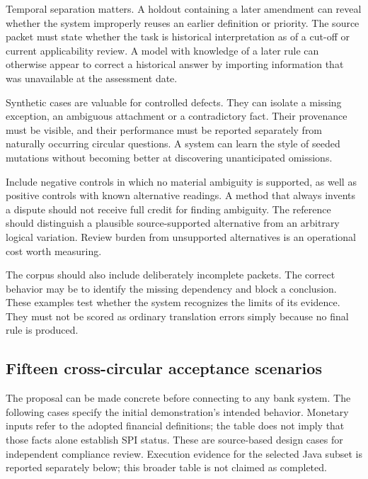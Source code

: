 Temporal separation matters. A holdout containing a later amendment can reveal
whether the system improperly reuses an earlier definition or priority. The
source packet must state whether the task is historical interpretation as of a
cut-off or current applicability review. A model with knowledge of a later rule
can otherwise appear to correct a historical answer by importing information
that was unavailable at the assessment date.

Synthetic cases are valuable for controlled defects. They can isolate a missing
exception, an ambiguous attachment or a contradictory fact. Their provenance must
be visible, and their performance must be reported separately from naturally
occurring circular questions. A system can learn the style of seeded mutations
without becoming better at discovering unanticipated omissions.

Include negative controls in which no material ambiguity is supported, as well
as positive controls with known alternative readings. A method that always
invents a dispute should not receive full credit for finding ambiguity. The
reference should distinguish a plausible source-supported alternative from an
arbitrary logical variation. Review burden from unsupported alternatives is an
operational cost worth measuring.

The corpus should also include deliberately incomplete packets. The correct
behavior may be to identify the missing dependency and block a conclusion. These
examples test whether the system recognizes the limits of its evidence. They
must not be scored as ordinary translation errors simply because no final rule
is produced.

\subsection{Fifteen cross-circular acceptance scenarios}
\label{merge:P-05-evidence:00}

\label{sec:evidence}

The proposal can be made concrete before connecting to any bank system. The
following cases specify the initial demonstration's intended behavior. Monetary
inputs refer to the adopted financial definitions; the table does not imply that
those facts alone establish SPI status. These are source-based design cases for
independent compliance review. Execution evidence for the selected Java subset
is reported separately below; this broader table is not claimed as completed.

